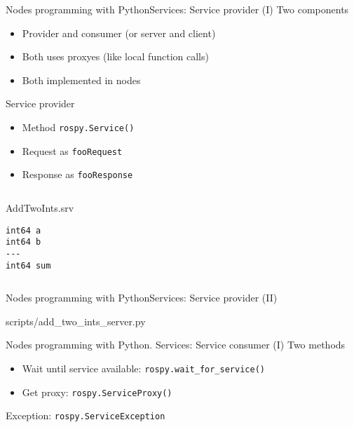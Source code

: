 \documentclass[10pt,compress]{beamer} %
\begin{document}
\begin{frame}[fragile]{Nodes programming with Python}{Services: Service provider (I)}
	Two components
	\begin{itemize}
		\item Provider and consumer (or server and client)
		\item Both uses proxyes (like local function calls)
		\item Both implemented in nodes
	\end{itemize}
	Service provider
	\begin{itemize}
		\item Method \texttt{rospy.Service()}
		\item Request as \texttt{fooRequest}
		\item Response as \texttt{fooResponse}
	\end{itemize}

	\vspace{-2cm}

    \begin{columns}
	\begin{exampleblock}{AddTwoInts.srv}
		\begin{verbatim}
int64 a
int64 b
---
int64 sum
\end{verbatim}
    \vspace{-0.3cm}
	\end{exampleblock}
	\end{columns}

\end{frame}

\begin{frame}{Nodes programming with Python}{Services: Service provider (II)}
    \vspace{-0.2cm}
	\begin{block}{scripts/add\_two\_ints\_server.py}
    \vspace{-0.2cm}
        
    \vspace{-0.2cm}
	\end{block}
\end{frame}

\begin{frame}{Nodes programming with Python. Services: Service consumer (I)}
	Two methods
	\begin{itemize}
		\item Wait until service available: \texttt{rospy.wait\_for\_service()}
		\item Get proxy: \texttt{rospy.ServiceProxy()}
	\end{itemize}
	Exception: \texttt{rospy.ServiceException}
\end{frame}
\end{document}
